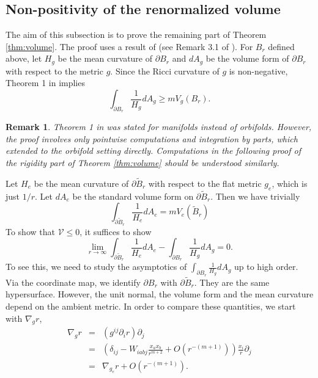 \documentclass{amsart}
\newtheorem{rem}[thm]{Remark}
\numberwithin{equation}{section}
\begin{document}
\subsection{Non-positivity of the renormalized volume}
\label{sub:ricci}
The aim of this subsection is to prove the remaining part of Theorem \ref{thm:volume}. The proof uses a result of \cite{ros1987} (see Remark 3.1 of \cite{biquard2023renormalized}). For $B_r$ defined above, let $H_g$ be the mean curvature of $\partial B_r$ and $dA_g$ be the volume form of $\partial B_r$ with respect to the metric $g$. Since the Ricci curvature of $g$ is non-negative, Theorem 1 in \cite{ros1987} implies
\[
	\int_{\partial B_r}\frac{1}{H_g} dA_g \geq m V_g(B_r).
\]
\begin{rem}
	Theorem 1 in \cite{ros1987} was stated for manifolds instead of orbifolds. However, the proof involves only pointwise computations and integration by parts, which extended to the orbifold setting directly. Computations in the following proof of the rigidity part of Theorem \ref{thm:volume} should be understood similarly.
\end{rem}
Let $H_e$ be the mean curvature of $\partial \tilde{B}_r$ with respect to the flat metric $g_e$, which is just $1/r$. Let $dA_e$ be the standard volume form on $\partial \tilde{B}_r$. Then we have trivially
\[
	\int_{\partial \tilde{B}_r} \frac{1}{H_e} dA_e = m V_e(\tilde{B}_r)
\]
To show that $\mathcal V\leq 0$, it suffices to show
\begin{equation}
	\label{eqn:goal}
	\lim_{r\to \infty } \int_{\partial \tilde{B}_r}\frac{1}{H_e}dA_e - \int_{\partial B_r}\frac{1}{H_g}dA_g=0.
\end{equation}
To see this, we need to study the asymptotics of $\int_{\partial B_r}\frac{1}{H_g}dA_g$ up to high order. Via the coordinate map, we identify $\partial B_r$ with $\partial \tilde{B}_r$. They are the same hypersurface. However, the unit normal, the volume form and the mean curvature depend on the ambient metric. In order to compare these quantities, we start with $\nabla_g r$,
\begin{eqnarray*}
	\nabla_g r &=& (g^{ij} \partial_i r) \partial_j\\
		   &=& (\delta_{ij}- W_{iabj}\frac{x_ax_b}{r^{m+2}} + O(r^{-(m+1)})) \frac{x_i}{r} \partial_j \\
		   &=& \nabla_{g_e} r + O(r^{-(m+1)}).
\end{eqnarray*}
\end{document}
